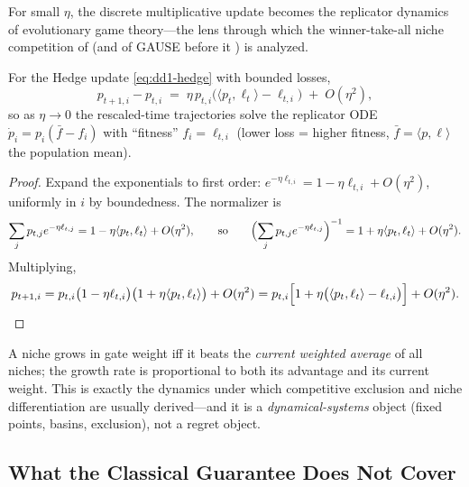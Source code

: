 For small $\eta$, the discrete multiplicative update becomes the replicator
dynamics of evolutionary game theory---the lens through which the
winner-take-all niche competition of \nm{} (and of GAUSE before it
\cite{li2026gause}) is analyzed.

\begin{proposition}
\label{prop:dd1-replicator}
For the Hedge update \eqref{eq:dd1-hedge} with bounded losses,
\begin{equation}
\label{eq:dd1-replicator}
p_{t+1, i} - p_{t, i}
\;=\; \eta\, p_{t,i} \bigl( \langle p_t, \ell_t \rangle - \ell_{t,i} \bigr)
\;+\; O(\eta^2),
\end{equation}
so as $\eta \to 0$ the rescaled-time trajectories solve the replicator ODE
$\dot{p}_i = p_i (\bar{f} - f_i)$ with ``fitness'' $f_i = \ell_{t,i}$ (lower
loss = higher fitness, $\bar{f} = \langle p, \ell\rangle$ the population
mean).
\end{proposition}

\begin{proof}
Expand the exponentials to first order: $e^{-\eta \ell_{t,i}} = 1 - \eta
\ell_{t,i} + O(\eta^2)$, uniformly in $i$ by boundedness. The normalizer is
\[
\sum_j p_{t,j} e^{-\eta \ell_{t,j}}
= 1 - \eta \langle p_t, \ell_t \rangle + O(\eta^2),
\qquad\text{so}\qquad
\Bigl( \sum_j p_{t,j} e^{-\eta \ell_{t,j}} \Bigr)^{-1}
= 1 + \eta \langle p_t, \ell_t \rangle + O(\eta^2).
\]
Multiplying,
\[
p_{t+1,i} = p_{t,i} \bigl(1 - \eta \ell_{t,i}\bigr)
\bigl(1 + \eta \langle p_t, \ell_t\rangle\bigr) + O(\eta^2)
= p_{t,i}\Bigl[ 1 + \eta\bigl( \langle p_t, \ell_t \rangle - \ell_{t,i}
\bigr) \Bigr] + O(\eta^2). \qedhere
\]
\end{proof}

\begin{intuition}
A niche grows in gate weight iff it beats the \emph{current
weighted average} of all niches; the growth rate is proportional to both its
advantage and its current weight. This is exactly the dynamics under which
competitive exclusion and niche differentiation are usually derived---and it
is a \emph{dynamical-systems} object (fixed points, basins, exclusion), not a
regret object.
\end{intuition}

\subsection{What the Classical Guarantee Does Not Cover}
\label{sec:dd1-online-limits}

